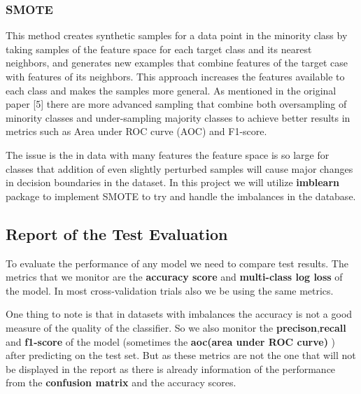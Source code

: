 \documentclass[11pt]{article}
\begin{document}
\hypertarget{smote}{%
\subsubsection{SMOTE}\label{smote}}

This method creates synthetic samples for a data point in the minority
class by taking samples of the feature space for each target class and
its nearest neighbors, and generates new examples that combine features
of the target case with features of its neighbors. This approach
increases the features available to each class and makes the samples
more general. As mentioned in the original paper {[}5{]} there are more
advanced sampling that combine both oversampling of minority classes and
under-sampling majority classes to achieve better results in metrics
such as Area under ROC curve (AOC) and F1-score.

The issue is the in data with many features the feature space is so
large for classes that addition of even slightly perturbed samples will
cause major changes in decision boundaries in the dataset. In this
project we will utilize \textbf{imblearn} package to implement SMOTE to
try and handle the imbalances in the database.

    \hypertarget{report-of-the-test-evaluation}{%
\subsection{Report of the Test
Evaluation}\label{report-of-the-test-evaluation}}

To evaluate the performance of any model we need to compare test
results. The metrics that we monitor are the \textbf{accuracy score} and
\textbf{multi-class log loss} of the model. In most cross-validation
trials also we be using the same metrics.

One thing to note is that in datasets with imbalances the accuracy is
not a good measure of the quality of the classifier. So we also monitor
the \textbf{precison},\textbf{recall} and \textbf{f1-score} of the model
(sometimes the \textbf{aoc(area under ROC curve)} ) after predicting on
the test set. But as these metrics are not the one that will not be
displayed in the report as there is already information of the
performance from the \textbf{confusion matrix} and the accuracy scores.
\end{document}

